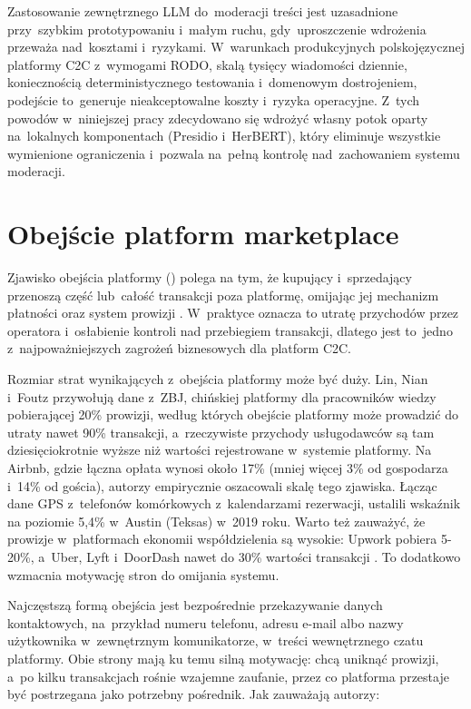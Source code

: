 \medskip
Zastosowanie zewnętrznego LLM do~moderacji treści jest uzasadnione
przy~szybkim prototypowaniu i~małym ruchu, gdy~uproszczenie wdrożenia przeważa
nad~kosztami i~ryzykami. W~warunkach produkcyjnych polskojęzycznej platformy C2C
z~wymogami RODO, skalą tysięcy wiadomości dziennie, koniecznością
deterministycznego testowania i~domenowym dostrojeniem, podejście to~generuje
nieakceptowalne koszty i~ryzyka operacyjne. Z~tych powodów w~niniejszej pracy
zdecydowano się wdrożyć własny potok oparty na~lokalnych komponentach
(Presidio i~HerBERT), który eliminuje wszystkie wymienione ograniczenia
i~pozwala na~pełną kontrolę nad~zachowaniem systemu moderacji.

\section{Obejście platform marketplace}
\label{sec:bypass}

Zjawisko obejścia platformy () polega na tym,
że kupujący i~sprzedający przenoszą część lub~całość transakcji poza platformę,
omijając jej mechanizm płatności oraz system prowizji \cite{bib:lin2022airbnb}.
W~praktyce oznacza to utratę przychodów przez operatora i~osłabienie kontroli nad
przebiegiem transakcji, dlatego jest to~jedno z~najpoważniejszych zagrożeń
biznesowych dla platform C2C.


Rozmiar strat wynikających z~obejścia platformy może być duży. Lin, Nian i~Foutz
\cite{bib:lin2022airbnb} przywołują dane z~ZBJ, chińskiej platformy dla pracowników
wiedzy pobierającej 20\% prowizji, według których obejście platformy może prowadzić
do utraty nawet 90\% transakcji, a~rzeczywiste przychody usługodawców są tam
dziesięciokrotnie wyższe niż wartości rejestrowane w~systemie platformy. Na Airbnb,
gdzie łączna opłata wynosi około 17\% (mniej więcej 3\% od gospodarza i~14\% od gościa),
autorzy empirycznie oszacowali skalę tego zjawiska. Łącząc dane GPS z~telefonów
komórkowych z~kalendarzami rezerwacji, ustalili wskaźnik na poziomie
5,4\% w~Austin (Teksas) w~2019 roku. Warto też zauważyć, że prowizje w~platformach
ekonomii współdzielenia są wysokie: Upwork pobiera 5-20\%, a~Uber, Lyft i~DoorDash nawet do
30\% wartości transakcji \cite{bib:lin2022airbnb}. To dodatkowo wzmacnia motywację
stron do omijania systemu.

Najczęstszą formą obejścia jest bezpośrednie przekazywanie danych kontaktowych,
na~przykład numeru telefonu, adresu e-mail albo nazwy użytkownika w~zewnętrznym
komunikatorze, w~treści wewnętrznego czatu platformy. Obie strony mają ku temu
silną motywację: chcą uniknąć prowizji, a~po kilku transakcjach rośnie wzajemne
zaufanie, przez co platforma przestaje być postrzegana jako potrzebny pośrednik.
Jak zauważają autorzy:

